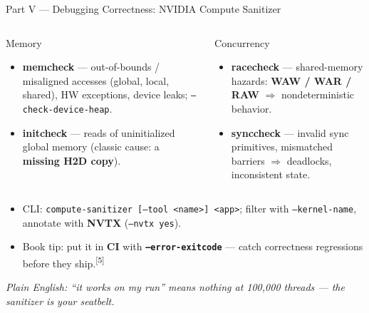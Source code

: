 \documentclass[aspectratio=169]{beamer}
\newcommand{\kw}[1]{\textbf{\textcolor{kwblue}{#1}}}
\newcommand{\pe}[1]{{\footnotesize\itshape Plain English: #1}}
\newcommand{\refmark}[1]{\textsuperscript{[#1]}}
\begin{document}
\begin{frame}{Part V --- Debugging Correctness: NVIDIA Compute Sanitizer}
  \begin{columns}[t]
    \begin{block}{Memory}
      \begin{itemize}\small
        \item \kw{memcheck} --- out-of-bounds / misaligned accesses (global, local, shared),
              HW exceptions, device leaks; \texttt{--check-device-heap}.
        \item \kw{initcheck} --- reads of uninitialized global memory
              (classic cause: a \kw{missing H2D copy}).
      \end{itemize}
    \end{block}
    \begin{exampleblock}{Concurrency}
      \begin{itemize}\small
        \item \kw{racecheck} --- shared-memory hazards: \kw{WAW / WAR / RAW}
              $\Rightarrow$ nondeterministic behavior.
        \item \kw{synccheck} --- invalid sync primitives, mismatched barriers
              $\Rightarrow$ deadlocks, inconsistent state.
      \end{itemize}
    \end{exampleblock}
  \end{columns}
  \medskip
  \begin{itemize}
    \item CLI: \texttt{compute-sanitizer [--tool <name>] <app>}; filter with
          \texttt{--kernel-name}, annotate with \kw{NVTX} (\texttt{--nvtx yes}).
    \item Book tip: put it in \kw{CI} with \kw{\texttt{--error-exitcode}} ---
          catch correctness regressions before they ship.\refmark{5}
  \end{itemize}
  \medskip
  \pe{``it works on my run'' means nothing at 100{,}000 threads --- the sanitizer is your seatbelt.}
\end{frame}
\end{document}

